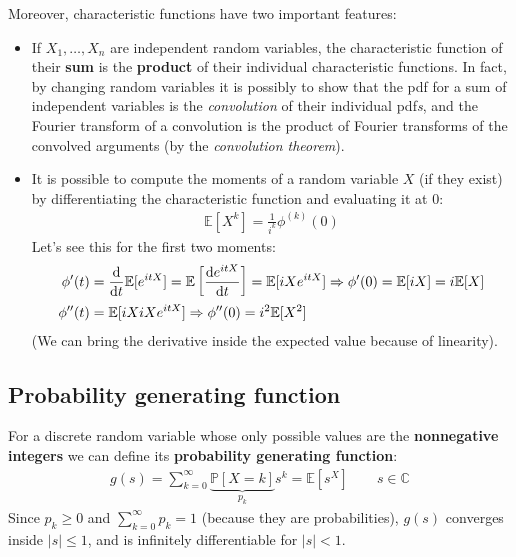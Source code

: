 \documentclass[../template.tex]{subfiles}
\begin{document}
Moreover, characteristic functions have two important features:
\begin{itemize}
    \item If $X_1, \dots, X_n$ are independent random variables, the characteristic function of their \textbf{sum} is the \textbf{product} of their individual characteristic functions. In fact, by changing random variables it is possibly to show that the pdf for a sum of independent variables is the \textit{convolution} of their individual pdf\textit{s}, and the Fourier transform of a convolution is the product of Fourier transforms of the convolved arguments (by the \textit{convolution theorem}).
    \item It is possible to compute the moments of a random variable $X$ (if they exist) by differentiating the characteristic function and evaluating it at $0$:
    \begin{align} \label{eqn:char-gen-mom}
        \mathbb{E}[X^k] = \frac{1}{i^k} \phi^{(k)} (0) 
    \end{align}
    Let's see this for the first two moments:
    \begin{align*}
        \phi'(t) &= \dv{t} \mathbb{E}[e^{itX}] = \mathbb{E}\left[\dv{e^{itX}}{t}\right] = \mathbb{E}[iX e^{itX}] \Rightarrow \phi'(0) = \mathbb{E}[iX] = i \mathbb{E}[X]\\
        \phi''(t) &= \mathbb{E}[iX iX e^{itX}] \Rightarrow \phi''(0) = i^2 \mathbb{E}[X^2]
    \end{align*}
    (We can bring the derivative inside the expected value because of linearity).
\end{itemize}

\subsection{Probability generating function}
For a discrete random variable whose only possible values are the \textbf{nonnegative integers} we can define its \textbf{probability generating function}:
\begin{align}\label{eqn:prob-gen}
    g(s) = \sum_{k=0}^\infty \underbrace{\mathbb{P}[X=k]}_{p_k}  s^k = \mathbb{E}[s^X] \qquad s \in \mathbb{C}
\end{align}  
Since $p_k \geq 0$ and $\sum_{k=0}^\infty p_k = 1$ (because they are probabilities), $g(s)$ converges inside $|s| \leq 1$, and is infinitely differentiable for $|s| < 1$.
\end{document}

